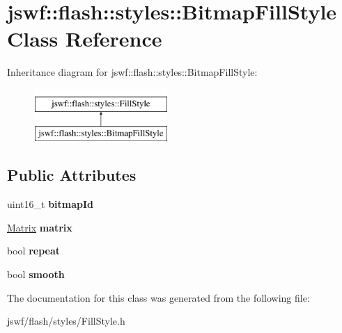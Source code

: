 \hypertarget{classjswf_1_1flash_1_1styles_1_1_bitmap_fill_style}{\section{jswf\+:\+:flash\+:\+:styles\+:\+:Bitmap\+Fill\+Style Class Reference}
\label{classjswf_1_1flash_1_1styles_1_1_bitmap_fill_style}
}
Inheritance diagram for jswf\+:\+:flash\+:\+:styles\+:\+:Bitmap\+Fill\+Style\+:\begin{figure}[H]
\begin{center}
\leavevmode
\includegraphics[height=2.000000cm]{classjswf_1_1flash_1_1styles_1_1_bitmap_fill_style}
\end{center}
\end{figure}
\subsection*{Public Attributes}
\begin{DoxyCompactItemize}
\item 
\hypertarget{classjswf_1_1flash_1_1styles_1_1_bitmap_fill_style_acdc7898f873830baa36cfe477779b0ce}{uint16\+\_\+t {\bfseries bitmap\+Id}}\label{classjswf_1_1flash_1_1styles_1_1_bitmap_fill_style_acdc7898f873830baa36cfe477779b0ce}

\item 
\hypertarget{classjswf_1_1flash_1_1styles_1_1_bitmap_fill_style_a8b27d3ace4d9a9c3cc925a4b158c75a3}{\hyperlink{structjswf_1_1flash_1_1_matrix}{Matrix} {\bfseries matrix}}\label{classjswf_1_1flash_1_1styles_1_1_bitmap_fill_style_a8b27d3ace4d9a9c3cc925a4b158c75a3}

\item 
\hypertarget{classjswf_1_1flash_1_1styles_1_1_bitmap_fill_style_a26f5c5903a21787e4ff280be30488fcb}{bool {\bfseries repeat}}\label{classjswf_1_1flash_1_1styles_1_1_bitmap_fill_style_a26f5c5903a21787e4ff280be30488fcb}

\item 
\hypertarget{classjswf_1_1flash_1_1styles_1_1_bitmap_fill_style_a7b8c7ea87b7784c57445677c3bfddf0b}{bool {\bfseries smooth}}\label{classjswf_1_1flash_1_1styles_1_1_bitmap_fill_style_a7b8c7ea87b7784c57445677c3bfddf0b}

\end{DoxyCompactItemize}


The documentation for this class was generated from the following file\+:\begin{DoxyCompactItemize}
\item 
jswf/flash/styles/Fill\+Style.\+h\end{DoxyCompactItemize}
